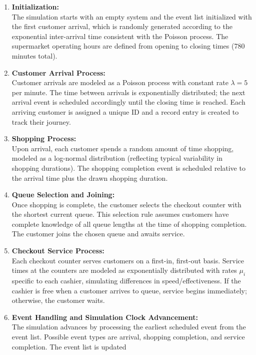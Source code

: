 \documentclass[
]{article}
\begin{document}
\begin{enumerate}
\def\labelenumi{\arabic{enumi}.}
\item
  \textbf{Initialization:}\\
  The simulation starts with an empty system and the event list
  initialized with the first customer arrival, which is randomly
  generated according to the exponential inter-arrival time consistent
  with the Poisson process. The supermarket operating hours are defined
  from opening to closing times (780 minutes total).
\item
  \textbf{Customer Arrival Process:}\\
  Customer arrivals are modeled as a Poisson process with constant rate
  \(\lambda = 5\) per minute. The time between arrivals is exponentially
  distributed; the next arrival event is scheduled accordingly until the
  closing time is reached. Each arriving customer is assigned a unique
  ID and a record entry is created to track their journey.
\item
  \textbf{Shopping Process:}\\
  Upon arrival, each customer spends a random amount of time shopping,
  modeled as a log-normal distribution (reflecting typical variability
  in shopping durations). The shopping completion event is scheduled
  relative to the arrival time plus the drawn shopping duration.
\item
  \textbf{Queue Selection and Joining:}\\
  Once shopping is complete, the customer selects the checkout counter
  with the shortest current queue. This selection rule assumes customers
  have complete knowledge of all queue lengths at the time of shopping
  completion. The customer joins the chosen queue and awaits service.
\item
  \textbf{Checkout Service Process:}\\
  Each checkout counter serves customers on a first-in, first-out basis.
  Service times at the counters are modeled as exponentially distributed
  with rates \(\mu_i\) specific to each cashier, simulating differences
  in speed/effectiveness. If the cashier is free when a customer arrives
  to queue, service begins immediately; otherwise, the customer waits.
\item
  \textbf{Event Handling and Simulation Clock Advancement:}\\
  The simulation advances by processing the earliest scheduled event
  from the event list. Possible event types are arrival, shopping
  completion, and service completion. The event list is updated

\end{enumerate}
\end{document}
